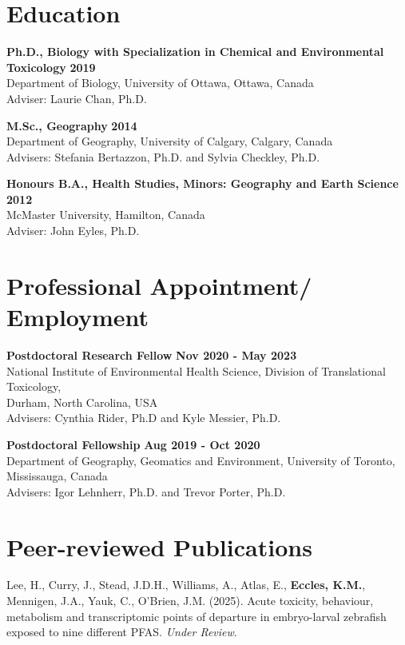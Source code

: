 \documentclass[margin,line]{res}
\begin{document}
\begin{resume}
\section{\sc Education}

\textbf{Ph.D., Biology with Specialization in Chemical and Environmental Toxicology} \hfill {\bf 2019}\\
Department of Biology, University of Ottawa, Ottawa, Canada \\
Adviser: Laurie Chan, Ph.D.

\textbf{M.Sc., Geography}  \hfill {\bf 2014}\\
Department of Geography, University of Calgary, Calgary, Canada\\
Advisers:  Stefania Bertazzon, Ph.D. and Sylvia Checkley, Ph.D.

\textbf{Honours B.A., Health Studies, Minors: Geography and Earth Science }\hfill {\bf 2012}\\
McMaster University, Hamilton, Canada\\
Adviser: John Eyles, Ph.D.

\vspace*{.1in}
\section{\sc Professional Appointment/ Employment}

{\bf  Postdoctoral Research Fellow} \hfill {\bf Nov 2020 - May 2023}\\
National Institute of Environmental Health Science, Division of Translational Toxicology,\\
Durham, North Carolina, USA\\
Advisers: Cynthia Rider, Ph.D and Kyle Messier, Ph.D.

{\bf Postdoctoral Fellowship} \hfill {\bf Aug 2019 - Oct 2020}\\
Department of Geography, Geomatics and Environment, University of Toronto, Mississauga, Canada\\
Advisers: Igor Lehnherr, Ph.D. and Trevor Porter, Ph.D.

\section{\sc Peer-reviewed Publications}


Lee, H., Curry, J., Stead, J.D.H., Williams, A., Atlas, E., \textbf{Eccles, K.M.}, Mennigen, J.A., Yauk, C., O'Brien, J.M. (2025). Acute toxicity, behaviour, metabolism and transcriptomic points of departure in embryo-larval zebrafish exposed to nine different PFAS. \textit{Under Review}.


\end{resume}
\end{document}
